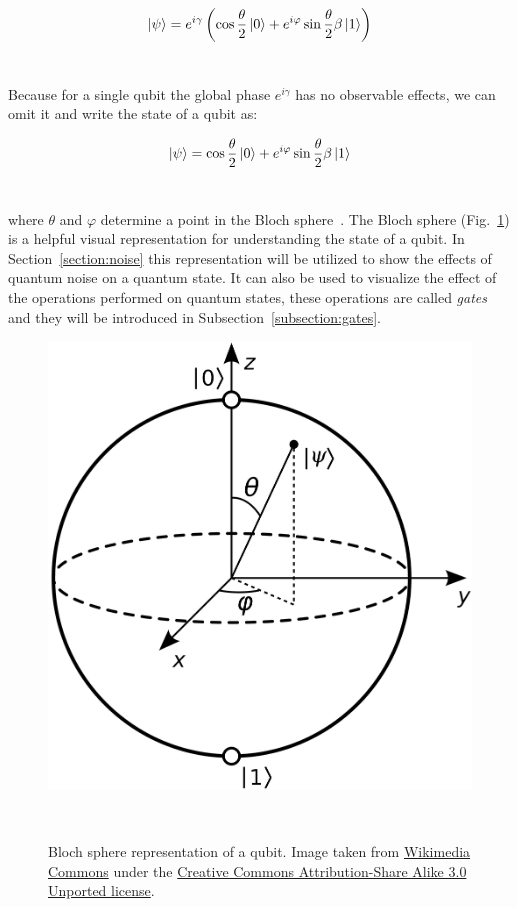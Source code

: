 \begin{equation}\label{eq:qubit_global_phase}
  \ket{\psi} = e^{i\gamma} \left( \cos{\frac{\theta}{2}}\ket{0} + e^{i\varphi}\sin{\frac{\theta}{2}}\beta\ket{1} \right)
\end{equation} \

Because for a single qubit the global phase \(e^{i\gamma}\) has no
observable effects, we can omit it and write the state of a qubit as: \

\begin{equation}\label{eq:qubit_bloch}
  \ket{\psi} = \cos{\frac{\theta}{2}}\ket{0} + e^{i\varphi}\sin{\frac{\theta}{2}}\beta\ket{1}
\end{equation} \

where \(\theta\) and \(\varphi\) determine a point in the Bloch
sphere~\cite{bloch_nuclear_1946}. The Bloch sphere (Fig.~\ref{fig:bloch_sphere})
is a helpful visual representation for understanding the state of a
qubit. In Section~\ref{section:noise} this representation will be
utilized to show the effects of quantum noise on a quantum state. It
can also be used to visualize the effect of the operations performed
on quantum states, these operations are called \textit{gates} and 
they will be introduced in Subsection~\ref{subsection:gates}. \

\begin{figure}[ht]
  \includegraphics[scale=0.1]{figures/Bloch_sphere.png}
  \centering
  \caption{Bloch sphere representation of a qubit. Image taken from \href{https://commons.wikimedia.org/wiki/File:Bloch_Sphere.svg}{Wikimedia Commons} under the \href{https://en.wikipedia.org/wiki/Creative_Commons}{Creative Commons Attribution-Share Alike 3.0 Unported license}.}
~\label{fig:bloch_sphere}
\end{figure} \

